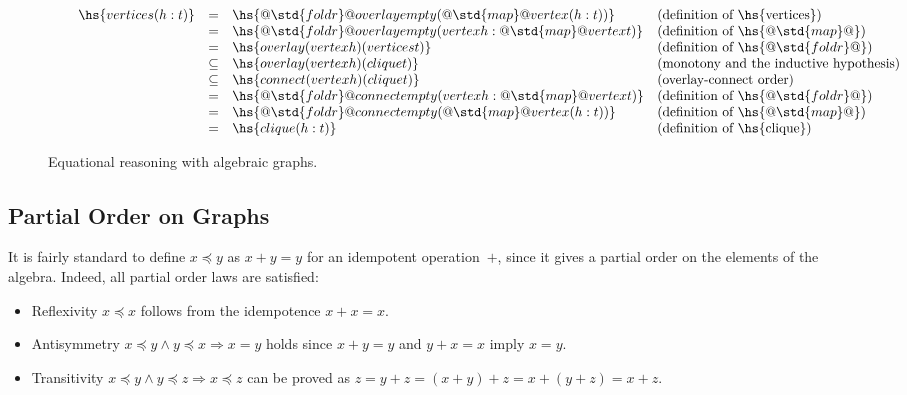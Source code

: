 \begin{figure}
\[
\begin{array}{rcll}
\hspace{6mm}\hs{vertices (h:t)} & = & \hs{@\std{foldr}@ overlay empty (@\std{map}@ vertex (h:t))} & \text{(definition of \hs{vertices})}\\
 & = & \hs{@\std{foldr}@ overlay empty (vertex h : @\std{map}@ vertex t)} & \text{(definition of }\hs{@\std{map}@}\text{)}\\
 & = & \hs{overlay (vertex h) (vertices t)} & \text{(definition of }\hs{@\std{foldr}@}\text{)}\\
 & \subseteq & \hs{overlay (vertex h) (clique t)} & \text{(monotony and the inductive hypothesis)}\\
 & \subseteq & \hs{connect (vertex h) (clique t)} & \text{(overlay-connect order)}\\
 & = & \hs{@\std{foldr}@ connect empty (vertex h : @\std{map}@ vertex t)} & \text{(definition of }\hs{@\std{foldr}@}\text{)}\\
 & = & \hs{@\std{foldr}@ connect empty (@\std{map}@ vertex (h:t))} & \text{(definition of }\hs{@\std{map}@}\text{)}\\
 & = & \hs{clique (h:t)} & \text{(definition of \hs{clique})}\\
\end{array}
\]
\vspace{-2mm}
\caption{Equational reasoning with algebraic graphs.\label{fig-proof}}
\end{figure}

\subsection{Partial Order on Graphs}\label{sub-partial-order}

It is fairly standard to define $x \preceq y$ as $x + y = y$ for an
idempotent operation~$+$, since it gives a partial order on the elements
of the algebra. Indeed, all partial order laws are satisfied:

\begin{itemize}
     \item Reflexivity $x \preceq x$ follows from the idempotence $x + x = x$.
     \item Antisymmetry $x \preceq y \wedge y \preceq x \Rightarrow x = y$ holds
     since $x + y = y$ and $y + x = x$ imply $x = y$.
     \item Transitivity $x \preceq y \wedge y \preceq z \Rightarrow x \preceq z$
     can be proved as $z = y + z = (x + y) + z = x + (y + z) = x + z$.
 \end{itemize}

